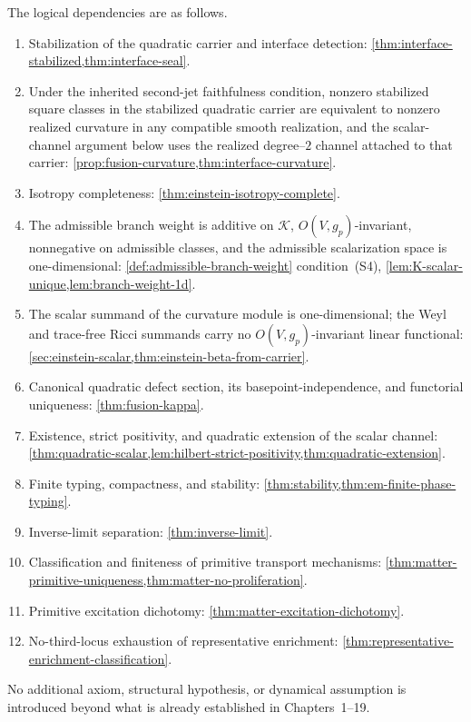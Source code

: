 The logical dependencies are as follows.
\begin{enumerate}[label=\textup{(\roman*)}]
\item
  Stabilization of the quadratic carrier and interface detection:
  \cref{thm:interface-stabilized,thm:interface-seal}.
\item
  Under the inherited second-jet faithfulness condition, nonzero
  stabilized square classes in the stabilized quadratic carrier are
  equivalent to nonzero realized curvature in any compatible smooth
  realization, and the scalar-channel argument below uses the realized
  degree--\(2\) channel attached to that carrier:
  \cref{prop:fusion-curvature,thm:interface-curvature}.
\item
  Isotropy completeness: \cref{thm:einstein-isotropy-complete}.
\item
  The admissible branch weight is additive on $\mathcal{K}$,
  $O(V,g_p)$-invariant, nonneg\-ative on admissible classes, and the
  admissible scalarization space is one-dimensional:
  \cref{def:admissible-branch-weight} condition~\textup{(S4)},
  \cref{lem:K-scalar-unique,lem:branch-weight-1d}.
\item
  The scalar summand of the curvature module is one-dimensional;
  the Weyl and trace-free Ricci summands carry no $O(V,g_p)$-invariant
  linear functional:
  \cref{sec:einstein-scalar,thm:einstein-beta-from-carrier}.
\item
  Canonical quadratic defect section, its basepoint-independence, and
  functorial uniqueness: \cref{thm:fusion-kappa}.
\item
  Existence, strict positivity, and quadratic extension of the scalar
  channel:
  \cref{thm:quadratic-scalar,lem:hilbert-strict-positivity,thm:quadratic-extension}.
\item
  Finite typing, compactness, and stability:
  \cref{thm:stability,thm:em-finite-phase-typing}.
\item
  Inverse-limit separation: \cref{thm:inverse-limit}.
\item
  Classification and finiteness of primitive transport mechanisms:
  \cref{thm:matter-primitive-uniqueness,thm:matter-no-proliferation}.
\item
  Primitive excitation dichotomy: \cref{thm:matter-excitation-dichotomy}.
\item
  No-third-locus exhaustion of representative enrichment:
  \cref{thm:representative-enrichment-classification}.
\end{enumerate}
No additional axiom, structural hypothesis, or dynamical assumption is
introduced beyond what is already established in Chapters~1--19.

